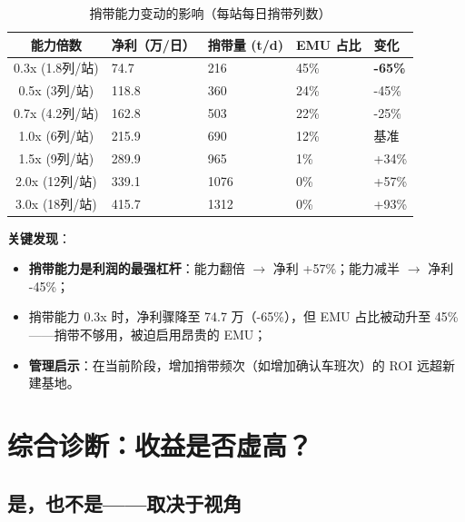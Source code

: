 \documentclass[12pt,a4paper,fontset=none]{ctexart}
\begin{document}
\begin{table}[H]
\centering\small
\caption{捎带能力变动的影响（每站每日捎带列数）}
\begin{tabular}{cC{2cm}C{2cm}C{2cm}C{2cm}}
\toprule
能力倍数 & 净利（万/日） & 捎带量 (t/d) & EMU 占比 & 变化 \\
\midrule
0.3x (1.8列/站) & 74.7 & 216 & 45\% & \textbf{-65\%} \\
0.5x (3列/站)   & 118.8 & 360 & 24\% & -45\% \\
0.7x (4.2列/站) & 162.8 & 503 & 22\% & -25\% \\
1.0x (6列/站)   & 215.9 & 690 & 12\% & 基准 \\
1.5x (9列/站)   & 289.9 & 965 & 1\%  & +34\% \\
2.0x (12列/站)  & 339.1 & 1076 & 0\%  & +57\% \\
3.0x (18列/站)  & 415.7 & 1312 & 0\%  & +93\% \\
\bottomrule
\end{tabular}
\end{table}

\textbf{关键发现}：
\begin{itemize}
    \item \textbf{捎带能力是利润的最强杠杆}：能力翻倍 $\rightarrow$ 净利 +57\%；能力减半 $\rightarrow$ 净利 -45\%；
    \item 捎带能力 0.3x 时，净利骤降至 74.7 万（-65\%），但 EMU 占比被动升至 45\%——捎带不够用，被迫启用昂贵的 EMU；
    \item \textbf{管理启示}：在当前阶段，增加捎带频次（如增加确认车班次）的 ROI 远超新建基地。
\end{itemize}

\section{综合诊断：收益是否虚高？}

\subsection{是，也不是——取决于视角}
\end{document}
